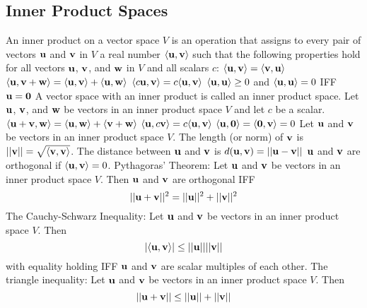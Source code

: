 \documentclass{article}
\begin{document}
        \subsection{Inner Product Spaces} 
        \begin{outline}
            \1 An inner product on a vector space $V$ is an operation that assigns to every pair of vectors \(\vb u\) and \(\vb v\) in $V$ a real number \(\langle\vb u,\vb v\rangle\) such that the following properties hold for all vectors \(\vb u\), \(\vb v\), and \(\vb w\) in $V$ and all scalars $c$:
                \2 \(\langle\vb u,\vb v\rangle=\langle\vb v,\vb u\rangle\)
                \2 \(\langle\vb u,\vb v+\vb w\rangle=\langle\vb u,\vb v\rangle+\langle\vb u,\vb w\rangle\)
                \2 \(\langle c\vb u,\vb v\rangle=c\langle\vb u,\vb v\rangle\)
                \2 \(\langle\vb u,\vb u\rangle\geq 0\) and \(\langle\vb u,\vb u\rangle=0\) IFF \(\vb u=\vb 0\)
            \1 A vector space with an inner product is called an inner product space. 
            \1 Let \(\vb u\), \(\vb v\), and \(\vb w\) be vectors in an inner product space $V$ and let \(c\) be a scalar. 
                \2 \(\langle\vb u+\vb v,\vb w\rangle=\langle\vb u,\vb w\rangle+\langle\vb v+\vb w\rangle\)
                \2 \(\langle\vb u,c\vb v\rangle=c\langle\vb u,\vb v\rangle\)
                \2 \(\langle\vb u,\vb 0\rangle=\langle\vb 0,\vb v\rangle=0\)
            \1 Let \(\vb u\) and \(\vb v\) be vectors in an inner product space $V$. 
                \2 The length (or norm) of \(\vb v\) is \(||\vb v||=\sqrt{\langle\vb v,\vb v\rangle}\). 
                \2 The distance between \(\vb u\) and \(\vb v\) is \(d(\vb u,\vb v)=||\vb u-\vb v||\)
                \2 \(\vb u\) and \(\vb v\) are orthogonal if \(\langle\vb u,\vb v\rangle=0\). 
            \1 Pythagoras' Theorem: Let \(\vb u\) and \(\vb v\) be vectors in an inner product space $V$. Then \(\vb u\) and \(\vb v\) are orthogonal IFF \[||\vb u+\vb v||^2=||\vb u||^2+||\vb v||^2\]
            \1 The Cauchy-Schwarz Inequality: Let \(\vb u\) and \(\vb v\) be vectors in an inner product space $V$. Then \[|\langle\vb u,\vb v\rangle|\leq||\vb u||||\vb v||\] with equality holding IFF $\vb u$ and $\vb v$ are scalar multiples of each other. 
      \1 The triangle inequality: Let $\vb u$ and $\vb v$ be vectors in an inner product space $V$. Then \[||\vb u+\vb v||\leq||\vb u||+||\vb v||\]
        \end{outline}
\end{document}
